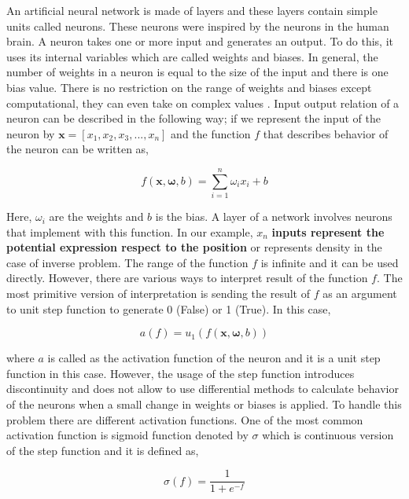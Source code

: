 \documentclass[a4paper,times,hidelinks,12pt]{article}
\begin{document}
An artificial neural network is made of layers and these layers contain simple units called neurons. These neurons were inspired by the neurons in the human brain. A neuron takes one or more input and generates an output. To do this, it uses its internal variables which are called weights and biases. In general, the number of weights in a neuron is equal to the size of the input and there is one bias value. There is no restriction on the range of weights and biases except computational, they can even take on complex values \cite{zimmermann2011comparison}. Input output relation of a neuron can be described in the following way; if we represent the input of the neuron by $\boldsymbol{x} = [x_1, x_2, x_3, ..., x_n]$ and the function $f$ that describes behavior of the neuron can be written as, 

\begin{equation}
\label{eq:NU_neuron}
f(\boldsymbol{x}, \boldsymbol{\omega}, b) = \sum\limits_{i = 1}^n \omega_i x_i + b
\end{equation}

\noindent Here, $\omega_i$ are the weights and $b$ is the bias. A layer of a network involves neurons that implement with this function. In our example, $x_n$ \textbf{inputs represent the potential expression respect to the position} or represents density in the case of inverse problem. The range of the function $f$ is infinite and it can be used directly. However, there are various ways to interpret result of the function $f$. The most primitive version of interpretation is sending the result of $f$ as an argument to unit step function to generate 0 (False) or 1 (True). In this case, 

\begin{equation}
\label{eq:NU_step_function}
a(f) = u_1(f(\boldsymbol{x}, \boldsymbol{\omega}, b))
\end{equation}

\noindent where $a$ is called as the activation function of the neuron and it is a unit step function in this case. However, the usage of the step function introduces discontinuity and does not allow to use differential methods to calculate behavior of the neurons when a small change in weights or biases is applied. To handle this problem there are different activation functions. 
One of the most common activation function is sigmoid function denoted by $\sigma$ which is continuous version of the step function and it is defined as,

\begin{equation}
\label{eq:NU_sigma_function}
\sigma(f) = \frac{1}{1 + e^{-f}}
\end{equation}
\end{document}

